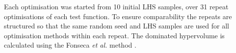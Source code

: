 \documentclass[conference]{IEEEtran}
\makeatletter
\newcommand{\parameterspace}{\mathcal{X}}
\newcommand\hpv{dominated hypervolume\xspace}
\newcommand\safmu{SAF$_{\mu}$\xspace}
\newcommand\safei{SAF$_{EI}$\xspace}
\newcommand\smsego{SMS-EGO\xspace}
\newcommand\smsegomu{SMS-EGO$_{\mu}$\xspace}
\newcommand\parego{ParEGO\xspace}
\newcommand\mpoi{MPoI\xspace}
\newcommand\ei{EI\xspace}
\newcommand\lhs{LHS\xspace}
\newcommand*{\etal}{\textit{et al.}\@\xspace}
\makeatother
\begin{document}



Each optimisation was started from 10 initial \lhs samples, over 31 repeat optimisations of each test function. To ensure comparability the repeats are structured so that the same random seed and \lhs samples are used for all optimisation methods within each repeat.  The \hpv is calculated using the Fonseca \etal  method \cite{fonseca2006improved}.

\end{document}
